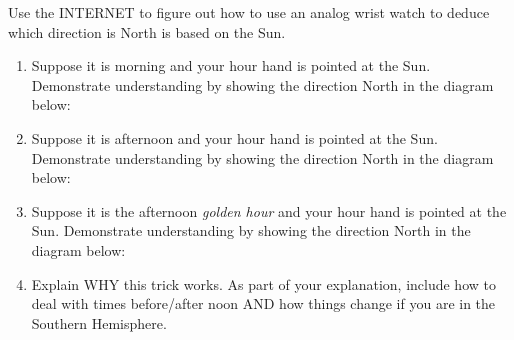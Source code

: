 \documentclass[noauthor,nooutcomes,handout,hints,12pt]{ximera}
\begin{document}
\mynewpage




\begin{question}
  Use the INTERNET to figure out how to use an analog wrist watch to
  deduce which direction is North is based on the Sun. 
  \begin{enumerate}
  \item Suppose it is morning and your hour hand is pointed at the
    Sun.  Demonstrate understanding by showing the direction North in
    the diagram below:
    \begin{center}
    \end{center}
     \item Suppose it is afternoon and your hour hand is pointed at
       the Sun. Demonstrate understanding by showing the direction
       North in the diagram below:
    \begin{center}
    \end{center}
  \item Suppose it is the afternoon \textit{golden hour} and your hour
    hand is pointed at the Sun. Demonstrate understanding by showing
    the direction North in the diagram below:
    \begin{center}
    \end{center}
  \item Explain WHY this trick works. As part of your explanation,
    include how to deal with times before/after noon AND how things
    change if you are in the Southern Hemisphere.
  \end{enumerate}




  
\end{question}
\end{document}
